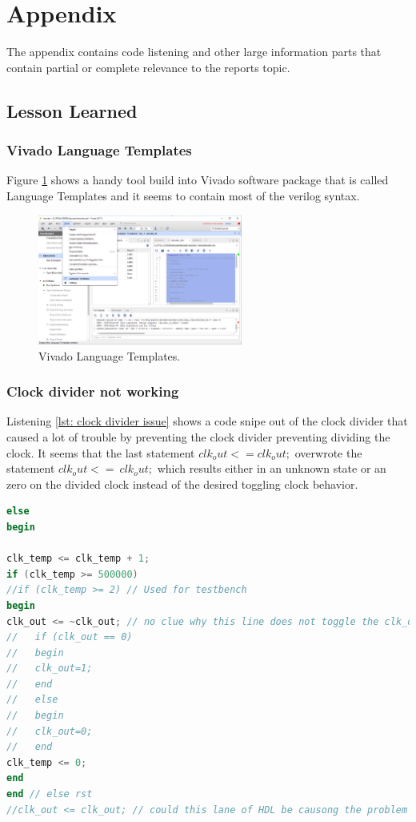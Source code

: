 \section{Appendix} \label{sec: Appendix}
The appendix contains code listening and other large information parts that contain partial or complete relevance to the reports topic. 

\subsection{Lesson Learned} \label{subsec: Lesson Learned}
\subsubsection{Vivado Language Templates} \label{subsubsec: Vivado Language Templates}
Figure \ref{fig: Vivado_LanguageTemplates} shows a handy tool build into Vivado software package that is called Language Templates and it seems to contain most of the verilog syntax.
\begin{figure}[htbp]
	\centering
	\includegraphics[width=0.6\textwidth]{01_images/Vivado_LanguageTemplates.png}
	\caption{Vivado Language Templates.}
	\label{fig: Vivado_LanguageTemplates}
\end{figure}
\subsubsection{Clock divider not working} \label{subsubsec: Clock divider not working}
Listening \ref{lst: clock divider issue} shows a code snipe out of the clock divider that caused a lot of trouble by preventing the clock divider preventing dividing the clock. It seems that the last statement $clk_out <= clk_out;$ overwrote the statement 
$clk_out <= ~clk_out;$ which results either in an unknown state or an zero on the divided clock instead of the desired toggling clock behavior. 
\begin{lstlisting}[language=verilog,caption={Clock divider issue.},label=lst: clock divider issue]
else
begin

clk_temp <= clk_temp + 1;
if (clk_temp >= 500000) 
//if (clk_temp >= 2) // Used for testbench
begin
clk_out <= ~clk_out; // no clue why this line does not toggle the clk_out
//   if (clk_out == 0) 
//   begin
//   clk_out=1;
//   end 
//   else
//   begin
//   clk_out=0;
//   end
clk_temp <= 0;
end
end // else rst
//clk_out <= clk_out; // could this lane of HDL be causong the problem of the not working clk divider? Yes, it is!!!

\end{lstlisting}

